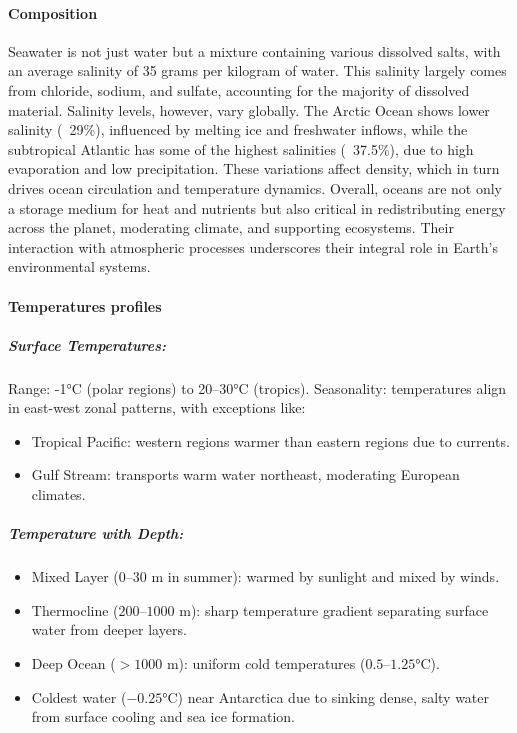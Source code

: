 \paragraph{Composition} Seawater is not just water but a mixture containing various dissolved salts, with an average salinity of 35 grams per kilogram of water. This salinity largely comes from chloride, sodium, and sulfate, accounting for the majority of dissolved material. Salinity levels, however, vary globally. The Arctic Ocean shows lower salinity (~29\%), influenced by melting ice and freshwater inflows, while the subtropical Atlantic has some of the highest salinities (~37.5\%), due to high evaporation and low precipitation. These variations affect density, which in turn drives ocean circulation and temperature dynamics.
Overall, oceans are not only a storage medium for heat and nutrients but also critical in redistributing energy across the planet, moderating climate, and supporting ecosystems. Their interaction with atmospheric processes underscores their integral role in Earth's environmental systems.
\paragraph{Temperatures profiles} 
\subparagraph{Surface Temperatures:} 
Range: -1°C (polar regions) to 20–30°C (tropics).
Seasonality: temperatures align in east-west zonal patterns, with exceptions like:
\begin{itemize}
    \item Tropical Pacific: western regions warmer than eastern regions due to currents.
    \item Gulf Stream: transports warm water northeast, moderating European climates.
\end{itemize}

\subparagraph{Temperature with Depth:}
\begin{itemize}
    \item Mixed Layer ($0–30$ m in summer):
warmed by sunlight and mixed by winds.
\item Thermocline ($200–1000$ m):
sharp temperature gradient separating surface water from deeper layers.
\item Deep Ocean ($>1000$ m):
uniform cold temperatures ($0.5–1.25°$C).
\item Coldest water ($-0.25°$C) near Antarctica due to sinking dense, salty water from surface cooling and sea ice formation.
\end{itemize}

